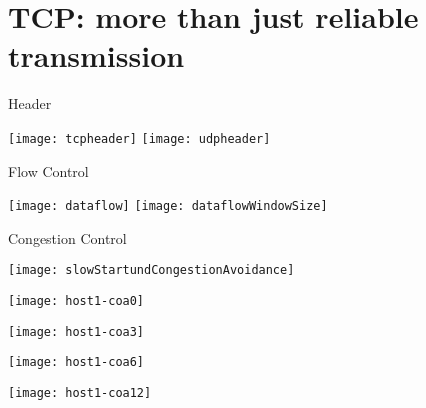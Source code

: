 \section{TCP: more than just reliable transmission}


\begin{frame}{Header}{}
	\begin{center} 
	\texttt{[image: tcpheader]}
	\texttt{[image: udpheader]}
	\end{center} 
\end{frame}

\begin{frame}{Flow Control}{}
	\begin{center} 
	\texttt{[image: dataflow]}
	\hspace{50}
	\texttt{[image: dataflowWindowSize]}
	\end{center} 
\end{frame}

\begin{frame}{Congestion Control}{}
	\begin{center} 
		\texttt{[image: slowStartundCongestionAvoidance]}
	\end{center} 
\end{frame}


\begin{frame}[plain]{}{}
	\begin{center} 
		\texttt{[image: host1-coa0]}
	\end{center} 
\end{frame}

\begin{frame}[plain]{}{}
	\begin{center} 
		\texttt{[image: host1-coa3]}
	\end{center} 
\end{frame}

\begin{frame}[plain]{}{}
	\begin{center} 
		\texttt{[image: host1-coa6]}
	\end{center} 
\end{frame}

\begin{frame}[plain]{}{}
	\begin{center} 
		\texttt{[image: host1-coa12]}
	\end{center} 
\end{frame}

